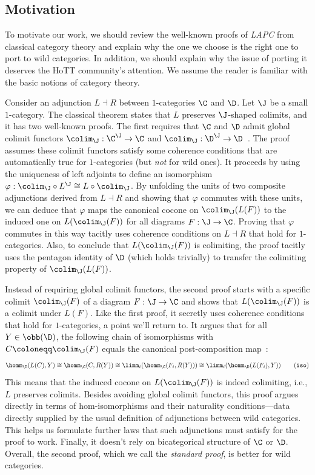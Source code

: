 \subsection{Motivation}

To motivate our work, we should review the well-known proofs of \emph{LAPC} from classical category theory and explain why the one we choose is the right one to port to wild categories. In addition, we should explain why the issue of porting it deserves the HoTT community's attention. We assume the reader is familiar with the basic notions of category theory.

Consider an adjunction $L \dashv R$ between $1$-categories $\C$ and $\D$. Let $\J$ be a small $1$-category. The classical theorem states that $L$ preserves $\J$-shaped colimits, and it has two well-known proofs. The first requires that $\C$ and $\D$ admit global colimit functors $\colim_{\J} : \C^{\J} \to \C$ and $\colim_{\J} : \D^{\J} \to \D$~\cite[Section V.5]{CTWM}. The proof assumes these colimit functors satisfy some coherence conditions that are automatically true for $1$-categories (but \emph{not} for wild ones). It proceeds by using the uniqueness of left adjoints to define an isomorphism $\varphi : \colim_{\J} \circ L^{\J} \cong  L \circ \colim_{\J}$. By unfolding the units of two composite adjunctions derived from $L \dashv R$ and showing that $\varphi$ commutes with these units, we can deduce that $\varphi$ maps the canonical cocone on $\colim_{\J}(L(F))$ to the induced one on $L(\colim_{\J}(F))$ for all diagrams $F : \J \to \C$. Proving that $\varphi$ commutes in this way tacitly uses coherence conditions on $L \dashv R$ that hold for $1$-categories. Also, to conclude that $L(\colim_{\J}(F))$ is colimiting, the proof tacitly uses the pentagon identity of $\D$ (which holds trivially) to transfer the colimiting property of $\colim_{\J}(L(F))$.

Instead of requiring global colimit functors, the second proof starts with a specific colimit $\colim_{\J}(F)$ of a diagram $F : \J \to \C$ and shows that $L(\colim_{\J}(F))$ is a colimit under $L(F)$. Like the first proof, it secretly uses coherence conditions that hold for $1$-categories, a point we'll return to. It argues that for all $Y \in \obb(\D)$, the following chain of isomorphisms with $C \coloneqq \colim_{\J}(F)$ equals the canonical post-composition map~\cite[Theorem 4.5.2]{CTIC}:
\[ \label{eq:iso}
  \homm_{\D}(L(C), Y) \cong \homm_{\C}(C, R(Y)) \cong \limm_i(\homm_{\C}(F_i, R(Y))) \cong \limm_i(\homm_{\D}(L(F_i), Y))\tag{\texttt{iso}}
\]
This means that the induced cocone on $L(\colim_{\J}(F))$ is indeed colimiting, i.e., $L$ preserves colimits. Besides avoiding global colimit functors, this proof argues directly in terms of hom-isomorphisms and their naturality conditions---data directly supplied by the usual definition of adjunctions between wild categories. This helps us formulate further laws that such adjunctions must satisfy for the proof to work. Finally, it doesn't rely on bicategorical structure of $\C$ or $\D$. Overall, the second proof, which we call the \emph{standard proof}, is better for wild categories.

